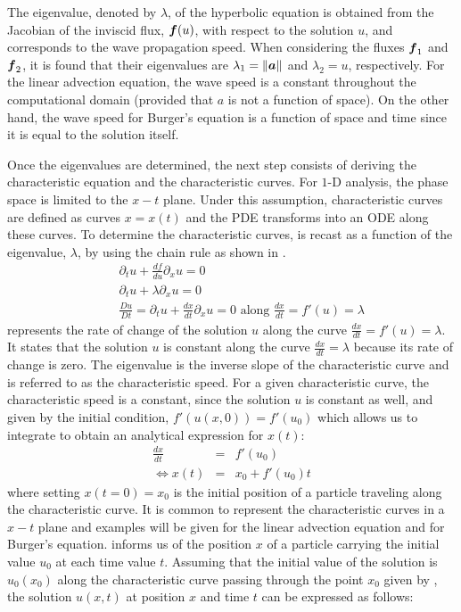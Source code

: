 The eigenvalue, denoted by $\lambda$, of the hyperbolic equation is obtained from the Jacobian of the inviscid flux, $\boldsymbol f(u)$, with respect to the solution $u$, and corresponds to the wave propagation speed. When considering the fluxes $\boldsymbol f_1$ and $\boldsymbol f_2$, it is found that their eigenvalues are $\lambda_1 = \|\boldsymbol a\|$ and $\lambda_2 = u$, respectively. For the linear advection equation, the wave speed is a constant throughout the computational domain (provided that $a$ is not a function of space). On the other hand, the wave speed for Burger's equation is a function of space and time since it is equal to the solution itself.

Once the eigenvalues are determined, the next step consists of deriving the characteristic equation and the characteristic curves. For $1$-D analysis, the phase space is limited to the $x-t$ plane. Under this assumption, characteristic curves are defined as curves $x = x(t)$ and the PDE transforms into an ODE \cite{Toro} along these curves. To determine the characteristic curves,  is recast as a function of the eigenvalue, $\lambda$, by using the chain rule as shown in .
%
\begin{eqnarray}\label{eq:ivp3_sct1b}
&&\partial_t u + \frac{df}{du}\partial_x u = 0 \nonumber\\
&&\partial_t u + \lambda \partial_x u = 0 \nonumber \\
&&\frac{Du}{Dt} = \partial_t u + \frac{dx}{dt} \partial_x u = 0 \text{ along } \frac{dx}{dt} = f'(u) = \lambda 
\end{eqnarray}
%
 represents the rate of change of the solution $u$ along the curve $\frac{dx}{dt} = f'(u) = \lambda$. It states that the solution $u$ is constant along the curve $\frac{dx}{dt} = \lambda$ because its rate of change is zero. The eigenvalue is the inverse slope of the characteristic curve and is referred to as the characteristic speed. 
For a given characteristic curve, the characteristic speed is a constant, since the solution $u$ is constant as well, and given by the initial condition, $f'(u(x,0))=f'(u_0)$ which allows us to integrate to obtain an analytical expression for $x(t)$:
%
\begin{eqnarray}\label{eq:ivp4_sct1b}
\frac{dx}{dt} &=& f'(u_0) \nonumber \\
\Leftrightarrow x(t) &=& x_0 + f'(u_0)t
\end{eqnarray}
%
where setting $x(t=0) = x_0$ is the initial position of a particle traveling along the characteristic curve. It is common to represent the characteristic curves in a $x-t$ plane and examples will be given for the linear advection equation and for Burger's equation.  informs us of the position $x$ of a particle carrying the initial value $u_0$ at each time value $t$. Assuming that the initial value of the solution is $u_0(x_0)$ along the characteristic curve passing through the point $x_0$ given by , the solution $u(x,t)$ at position $x$ and time $t$ can be expressed as follows:
